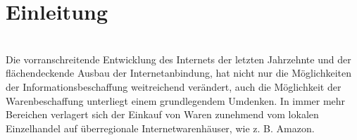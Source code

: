 %
\chapter{Einleitung}
\label{sec:Einleitung}

 \\[20mm]


Die vorranschreitende Entwicklung des Internets der letzten Jahrzehnte und der flächendeckende Ausbau der Internetanbindung, hat nicht nur die Möglichkeiten der Informationsbeschaffung weitreichend verändert, auch die Möglichkeit der Warenbeschaffung unterliegt einem grundlegendem Umdenken. In immer mehr Bereichen verlagert sich der Einkauf von Waren zunehmend vom lokalen Einzelhandel auf überregionale Internetwarenhäuser, wie z. B. Amazon.

